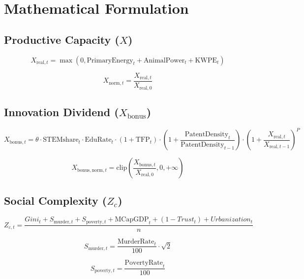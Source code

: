 \documentclass{article}
\begin{document}
\section{Mathematical Formulation}

\subsection{Productive Capacity ($X$)}
\begin{equation}
X_{\mathrm{real},t} = \max \left( 0, \mathrm{PrimaryEnergy}_t + \mathrm{AnimalPower}_t + \mathrm{KWPE}_t \right)
\end{equation}

\begin{equation}
X_{\mathrm{norm},t} = \frac{X_{\mathrm{real},t}}{X_{\mathrm{real},0}}
\end{equation}

\subsection{Innovation Dividend ($X_{\mathrm{bonus}}$)}
\begin{equation}
X_{\mathrm{bonus},t} = \theta \cdot \mathrm{STEMshare}_t \cdot \mathrm{EduRate}_t \cdot (1 + \mathrm{TFP}_t) 
\cdot \left( 1 + \frac{\mathrm{PatentDensity}_t}{\mathrm{PatentDensity}_{t-1}} \right)
\cdot \left( 1 + \frac{X_{\mathrm{real},t}}{X_{\mathrm{real},t-1}} \right)^{P}
\end{equation}

\begin{equation}
X_{\mathrm{bonus,norm},t} = \mathrm{clip} \left( \frac{X_{\mathrm{bonus},t}}{X_{\mathrm{real},0}}, 0, +\infty \right)
\end{equation}

\subsection{Social Complexity ($Z_c$)}
\begin{equation}
Z_{c,t} = \frac{Gini_t + S_{\mathrm{murder},t} + S_{\mathrm{poverty},t} + \mathrm{MCapGDP}_t + (1 - Trust_t) + Urbanization_t}{n}
\end{equation}

\begin{equation}
S_{\mathrm{murder},t} = \frac{\mathrm{MurderRate}_t}{100} \cdot \sqrt{2}
\end{equation}

\begin{equation}
S_{\mathrm{poverty},t} = \frac{\mathrm{PovertyRate}_t}{100}
\end{equation}
\end{document}
